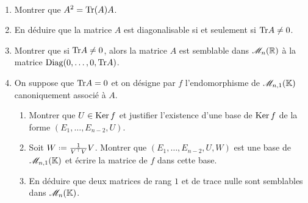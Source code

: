\begin{exercice}
     \\
    \begin{enumerate}
        \item Montrer que $A^2 = \mathrm{Tr} (A) A$.
        \item En déduire que la matrice $A$ est diagonalisable si et seulement si $\mathrm{Tr} A \not= 0$.
        \item Montrer que si $\mathrm{Tr} A \not= 0$, alors la matrice $A$ est semblable dans $\mathscr{M}_n(\mathbb{R})$ à la matrice $\mathrm{Diag}(0, \dots, 0, \mathrm{Tr} A)$.
        \item On suppose que $\mathrm{Tr} A = 0$ et on désigne par $f$ l'endomorphisme de $\mathscr{M}_{n,1}(\mathbb{K})$ canoniquement associé à $A$. 
        \begin{enumerate}
            \item Montrer que $U \in \mathrm{Ker}\, f$ et justifier l'existence d'une base de $\mathrm{Ker}\, f$ de la forme $(E_1, \dots, E_{n-2}, U)$. 
            \item Soit $W \defeq \frac{1}{\Trsp{V}V}V$. Montrer que $(E_1, \dots, E_{n-2}, U, W)$ est une base de $\mathscr{M}_{n,1}(\mathbb{K})$ et écrire la matrice de $f$ dans cette base. 
            \item En déduire que deux matrices de rang $1$ et de trace nulle sont semblables dans $\mathscr{M}_n(\mathbb{K})$.
        \end{enumerate}
    \end{enumerate}
\end{exercice}